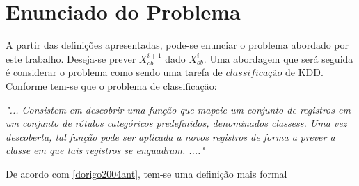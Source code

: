 \section{Enunciado do Problema}

A partir das definições apresentadas, pode-se enunciar o problema 
abordado por este trabalho. Deseja-se prever $X_{ob}^{i+1}$ dado
$X_{ob}^{i}$. Uma abordagem que será seguida é considerar
o problema como sendo uma tarefa de $classificação$ de KDD. Conforme
\cite{passos2005datamining} tem-se que o problema de classificação:

\begin{description}
  \item \textit{"... Consistem em descobrir uma função que mapeie um conjunto de
  registros em um conjunto de rótulos categóricos predefinidos, denominados
  classess. Uma vez descoberta, tal função pode ser aplicada a novos registros
  de forma a prever a classe em que tais registros se enquadram. ...."}
\end{description}

De acordo com \ref{dorigo2004ant}, tem-se uma definição mais formal
